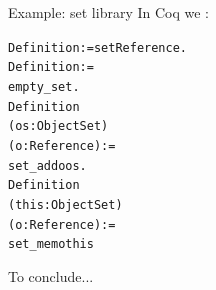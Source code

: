 \documentclass[final,nocolorBG,a4,mobius,nototal,pdf,slideColor]{prosper}
\begin{document}
\begin{slide}{Example: set library}
In Coq we :
\begin{alltt}
Definition  := set Reference. 
Definition  := 
                     empty\_set.
Definition  
                     (os: ObjectSet) 
                     (o: Reference) :=  
                     set\_add o os.
Definition  
                     (this: ObjectSet) 
                     (o: Reference) := 
                     set\_mem o this
\end{alltt}
\end{slide}

\begin{slide}{To conclude...}
\end{slide}
\end{document}

